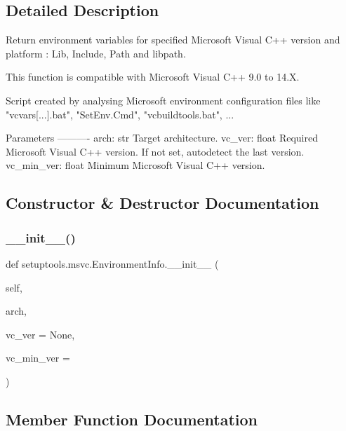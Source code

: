\subsection{Detailed Description}
\begin{DoxyVerb}Return environment variables for specified Microsoft Visual C++ version
and platform : Lib, Include, Path and libpath.

This function is compatible with Microsoft Visual C++ 9.0 to 14.X.

Script created by analysing Microsoft environment configuration files like
"vcvars[...].bat", "SetEnv.Cmd", "vcbuildtools.bat", ...

Parameters
----------
arch: str
    Target architecture.
vc_ver: float
    Required Microsoft Visual C++ version. If not set, autodetect the last
    version.
vc_min_ver: float
    Minimum Microsoft Visual C++ version.
\end{DoxyVerb}
 

\subsection{Constructor \& Destructor Documentation}
\mbox{\label{classsetuptools_1_1msvc_1_1EnvironmentInfo_aadd626f118e5f34282667e8abf966a1f}} 
\subsubsection{\texorpdfstring{\+\_\+\+\_\+init\+\_\+\+\_\+()}{\_\_init\_\_()}}
{\footnotesize\ttfamily def setuptools.\+msvc.\+Environment\+Info.\+\_\+\+\_\+init\+\_\+\+\_\+ (\begin{DoxyParamCaption}\item[{}]{self,  }\item[{}]{arch,  }\item[{}]{vc\+\_\+ver = {\ttfamily None},  }\item[{}]{vc\+\_\+min\+\_\+ver = {} }\end{DoxyParamCaption})}



\subsection{Member Function Documentation}
\mbox{\label{classsetuptools_1_1msvc_1_1EnvironmentInfo_a95f7df78e6bc6122e224e05888e98292}} 
